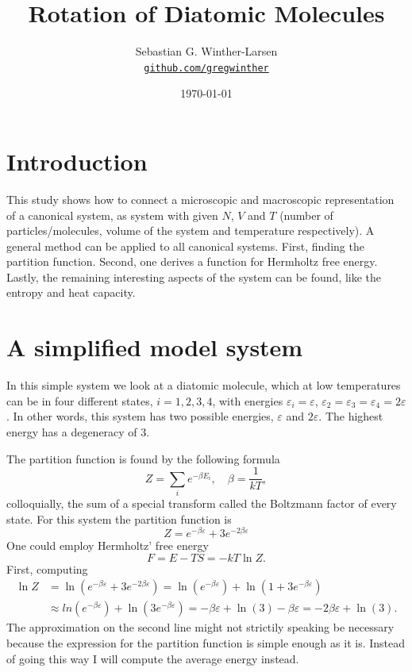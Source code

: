 \documentclass[10pt,a4paper]{amsart}
\title[Rotation of Diatomic Molecules]{Rotation of Diatomic Molecules \\
	\hrulefill\fbox{FYS2160}\hrulefill}
\author[Winther-Larsen]{Sebastian G. Winther-Larsen\\
\href{https://github.com/gregwinther/FYS2160/}{\texttt{github.com/gregwinther}}}
\date{\today}
\begin{document}
\maketitle

\tableofcontents

\section{Introduction}
This study shows how to connect a microscopic and macroscopic representation of a canonical system, as system with given $N$, $V$ and $T$ (number of particles/molecules, volume of the system and temperature respectively). A general method can be applied to all canonical systems. First, finding the partition function. Second, one derives a function for Hermholtz free energy. Lastly, the remaining interesting aspects of the system can be found, like the entropy and heat capacity.

\section{A simplified model system}
In this simple system we look at a diatomic molecule, which at low temperatures can be in four different states, $i=1,2,3,4$, with energies $\varepsilon_i=\varepsilon$, $\varepsilon_2=\varepsilon_3=\varepsilon_4=2\varepsilon$. In other words, this system has two possible energies, $\varepsilon$ and $2\varepsilon$. The highest energy has a degeneracy of $3$.

The partition function is found by the following formula
\begin{equation}
Z = \sum_ie^{-\beta E_i},\quad \beta=\frac{1}{kT},
\end{equation}
colloquially, the sum of a special transform called the Boltzmann factor of every state. For this system the partition function is
\begin{equation}
Z = e^{-\beta\varepsilon}+3e^{-2\beta\varepsilon}
\end{equation}
One could employ Hermholtz' free energy
\begin{equation}
F = E - TS= -kT\ln Z.
\end{equation}
First, computing
\begin{align*}
\ln Z &= \ln (e^{-\beta\varepsilon}+3e^{-2\beta\varepsilon} ) = \ln( e^{-\beta\varepsilon}) + \ln(1+3e^{-\beta\varepsilon} ) \\
&\approx ln( e^{-\beta\varepsilon}) + \ln(3e^{-\beta\varepsilon} )  = -\beta\varepsilon + \ln(3) -\beta\varepsilon  = -2\beta\varepsilon + \ln(3).
\end{align*}
The approximation on the second line might not strictily speaking be necessary because the expression for the partition function is simple enough as it is. Instead of going this way I will compute the average energy instead.
\end{document}
